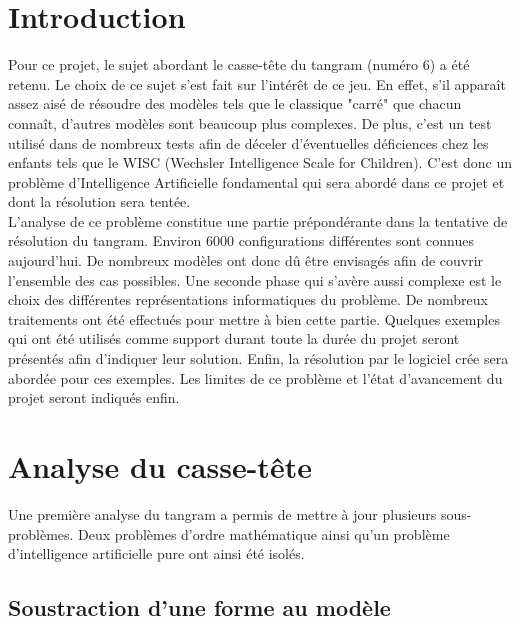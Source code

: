 \documentclass[a4paper, 11pt]{report}
\begin{document}
	\newpage
	
	
	
	\chapter*{Introduction}
	
		Pour ce projet, le sujet abordant le casse-tête du tangram (numéro 6) a été retenu. Le choix de ce sujet s'est fait sur l'intérêt de ce jeu. En effet, s'il apparaît assez aisé de résoudre des modèles tels que le classique "carré" que chacun connaît, d'autres modèles sont beaucoup plus complexes. De plus, c'est un test utilisé dans de nombreux tests afin de déceler d'éventuelles déficiences chez les enfants tels que le WISC (Wechsler Intelligence Scale for Children). C'est donc un problème d'Intelligence Artificielle fondamental qui sera abordé dans ce projet et dont la résolution sera tentée.\\
L'analyse de ce problème constitue une partie prépondérante dans la tentative de résolution du tangram. Environ 6000 configurations différentes sont connues aujourd'hui. De nombreux modèles ont donc dû être envisagés afin de couvrir l'ensemble des cas possibles. Une seconde phase qui s'avère aussi complexe est le choix des différentes représentations informatiques du problème. De nombreux traitements ont été effectués pour mettre à bien cette partie. Quelques exemples qui ont été utilisés comme support durant toute la durée du projet seront présentés afin d'indiquer leur solution. Enfin, la résolution par le logiciel crée sera abordée pour ces exemples. Les limites de ce problème et l'état d'avancement du projet seront indiqués enfin.


	\newpage

	\chapter{Analyse du casse-t\^ete}
	
	Une première analyse du tangram a permis de mettre à jour plusieurs sous-problèmes. Deux problèmes d'ordre mathématique ainsi qu'un problème d'intelligence artificielle pure ont ainsi été isolés. 
	
		\section{Soustraction d'une forme au modèle}
		
\end{document}
